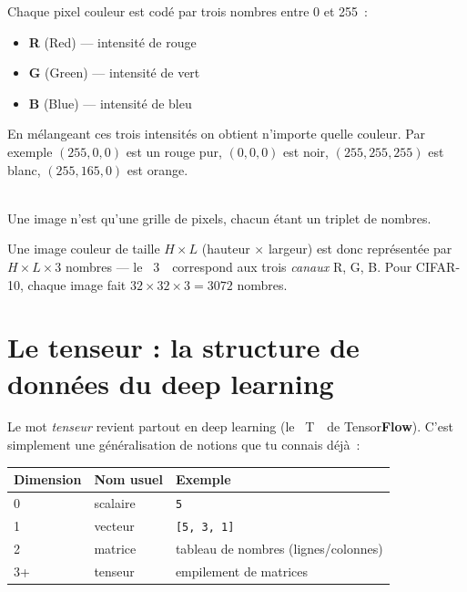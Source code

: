 \documentclass[11pt,a4paper]{article}
\begin{document}
Chaque pixel couleur est cod\'e par trois nombres entre 0 et 255~:
\begin{itemize}[nosep]
  \item \textbf{R} (Red) --- intensit\'e de rouge
  \item \textbf{G} (Green) --- intensit\'e de vert
  \item \textbf{B} (Blue) --- intensit\'e de bleu
\end{itemize}

En m\'elangeant ces trois intensit\'es on obtient n'importe quelle
couleur. Par exemple $(255, 0, 0)$ est un rouge pur, $(0, 0, 0)$ est
noir, $(255, 255, 255)$ est blanc, $(255, 165, 0)$ est orange.

\begin{center}
\\[0.3em]
{\small Une image n'est qu'une grille de pixels, chacun \'etant un triplet de nombres.}
\end{center}

Une image couleur de taille $H \times L$ (hauteur $\times$ largeur) est
donc repr\'esent\'ee par $H \times L \times 3$ nombres --- le \guillemotleft~3~\guillemotright\
correspond aux trois \emph{canaux} R, G, B. Pour CIFAR-10, chaque image
fait $32 \times 32 \times 3 = 3072$ nombres.

\section{Le tenseur : la structure de donn\'ees du deep learning}

Le mot \emph{tenseur} revient partout en deep learning (le \guillemotleft~T~\guillemotright\ de
Tensor\textbf{Flow}). C'est simplement une g\'en\'eralisation de notions
que tu connais d\'ej\`a~:

\begin{center}
\begin{tabular}{@{}lll@{}}
\toprule
Dimension & Nom usuel & Exemple \\
\midrule
0 & scalaire & \texttt{5} \\
1 & vecteur & \texttt{[5, 3, 1]} \\
2 & matrice & tableau de nombres (lignes/colonnes) \\
3+ & tenseur & empilement de matrices \\
\bottomrule
\end{tabular}
\end{center}
\end{document}

